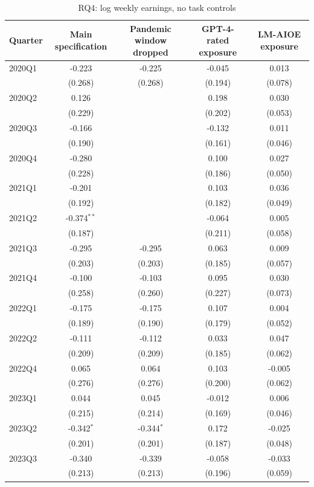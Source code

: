 \begin{table}[htbp]\centering
\caption{RQ4: log weekly earnings, no task controls}
\begin{tabular}{lcccc}
\toprule
Quarter & Main specification & Pandemic window dropped & GPT-4-rated exposure & LM-AIOE exposure \\
\midrule
2020Q1 & -0.223 & -0.225 & -0.045 & 0.013 \\
 & (0.268) & (0.268) & (0.194) & (0.078) \\
2020Q2 & 0.126 &  & 0.198 & 0.030 \\
 & (0.229) &  & (0.202) & (0.053) \\
2020Q3 & -0.166 &  & -0.132 & 0.011 \\
 & (0.190) &  & (0.161) & (0.046) \\
2020Q4 & -0.280 &  & 0.100 & 0.027 \\
 & (0.228) &  & (0.186) & (0.050) \\
2021Q1 & -0.201 &  & 0.103 & 0.036 \\
 & (0.192) &  & (0.182) & (0.049) \\
2021Q2 & -0.374$^{**}$ &  & -0.064 & 0.005 \\
 & (0.187) &  & (0.211) & (0.058) \\
2021Q3 & -0.295 & -0.295 & 0.063 & 0.009 \\
 & (0.203) & (0.203) & (0.185) & (0.057) \\
2021Q4 & -0.100 & -0.103 & 0.095 & 0.030 \\
 & (0.258) & (0.260) & (0.227) & (0.073) \\
2022Q1 & -0.175 & -0.175 & 0.107 & 0.004 \\
 & (0.189) & (0.190) & (0.179) & (0.052) \\
2022Q2 & -0.111 & -0.112 & 0.033 & 0.047 \\
 & (0.209) & (0.209) & (0.185) & (0.062) \\
2022Q4 & 0.065 & 0.064 & 0.103 & -0.005 \\
 & (0.276) & (0.276) & (0.200) & (0.062) \\
2023Q1 & 0.044 & 0.045 & -0.012 & 0.006 \\
 & (0.215) & (0.214) & (0.169) & (0.046) \\
2023Q2 & -0.342$^{*}$ & -0.344$^{*}$ & 0.172 & -0.025 \\
 & (0.201) & (0.201) & (0.187) & (0.048) \\
2023Q3 & -0.340 & -0.339 & -0.058 & -0.033 \\
 & (0.213) & (0.213) & (0.196) & (0.059) \\

\end{tabular}
\end{table}
